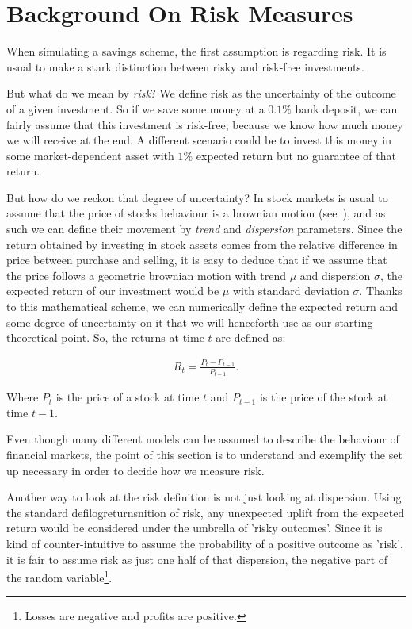 \section{Background On Risk Measures} \label{sec:risk}

When simulating a savings scheme, the first assumption is regarding risk. It is usual to make a stark distinction between risky and risk-free investments.

But what do we mean by \textit{risk}? We define risk as the uncertainty of the outcome of a given investment. So if we save some money at a $0.1 \%$ bank deposit, we can fairly assume that this investment is risk-free, because we know how much money we will receive at the end. A different scenario could be to invest this money in some market-dependent asset with $1 \%$ expected return but no guarantee of that return.

But how do we reckon that degree of uncertainty? In stock markets is usual to assume that the price of stocks behaviour is a brownian motion (see~\cite{b:cootner-random, a:samuelson-speculative}), and as such we can define their movement by \textit{trend} and \textit{dispersion} parameters. Since the return obtained by investing in stock assets comes from the relative difference in price between purchase and selling, it is easy to deduce that if we assume that the price follows a geometric brownian motion with trend $\mu$ and dispersion $\sigma$, the expected return of our investment would be $\mu$ with standard deviation $\sigma$. Thanks to this mathematical scheme, we can numerically define the expected return and some degree of uncertainty on it that we will henceforth use as our starting theoretical point. So, the returns at time $t$ are defined as:

\begin{align} \label{eq:return}
    R_t = \frac{P_t - P_{t-1}}{P_{t-1}}\textit{.}
\end{align}

Where $P_t$ is the price of a stock at time $t$ and $P_{t-1}$ is the price of the stock at time $t-1$.

Even though many different models can be assumed to describe the behaviour of financial markets, the point of this section is to understand and exemplify the set up necessary in order to decide how we measure risk.

Another way to look at the risk definition is not just looking at dispersion. Using the standard defilogreturnsnition of risk, any unexpected uplift from the expected return would be considered under the umbrella of 'risky outcomes'. Since it is kind of counter-intuitive to assume the probability of a positive outcome as 'risk', it is fair to assume risk as just one half of that dispersion, the negative part of the random variable\footnote{Losses are negative and profits are positive.}.

